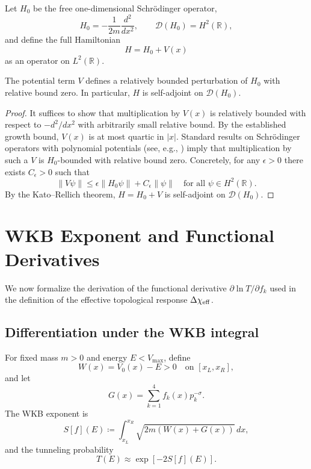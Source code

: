 \documentclass[11pt]{article}
\begin{document}
Let \(H_0\) be the free one-dimensional Schr\"odinger operator,
\begin{equation}
  H_0 = -\frac{1}{2m}\frac{d^2}{dx^2},
  \qquad \mathcal{D}(H_0) = H^2(\mathbb{R}),
\end{equation}
and define the full Hamiltonian
\begin{equation}
  H = H_0 + V(x)
\end{equation}
as an operator on \(L^2(\mathbb{R})\).

\begin{lemma}
The potential term \(V\) defines a relatively bounded perturbation of
\(H_0\) with relative bound zero. In particular, \(H\) is
self-adjoint on \(\mathcal{D}(H_0)\).
\end{lemma}

\begin{proof}
It suffices to show that multiplication by \(V(x)\) is relatively
bounded with respect to \(-d^2/dx^2\) with arbitrarily small relative
bound. By the established growth bound, \(V(x)\) is at most quartic in
\(|x|\). Standard results on Schr\"odinger operators with polynomial
potentials (see, e.g., \cite{reed_simon2}) imply that multiplication by
such a \(V\) is \(H_0\)-bounded with relative bound zero. Concretely,
for any \(\epsilon>0\) there exists \(C_\epsilon>0\) such that
\begin{equation}
  \|V\psi\| \le \epsilon \|H_0\psi\| + C_\epsilon \|\psi\|
  \quad\text{for all } \psi\in H^2(\mathbb{R}).
\end{equation}
By the Kato--Rellich theorem, \(H = H_0 + V\) is self-adjoint on
\(\mathcal{D}(H_0)\).
\end{proof}

\section{WKB Exponent and Functional Derivatives}

We now formalize the derivation of the functional derivative
\(\partial \ln T / \partial f_k\) used in the definition of the
effective topological response \(\Delta\chi_{\rm eff}\).

\subsection{Differentiation under the WKB integral}

For fixed mass \(m>0\) and energy \(E<V_{\max}\), define
\begin{equation}
  W(x) = V_0(x) - E > 0 \quad \text{on } [x_L,x_R],
\end{equation}
and let
\begin{equation}
  G(x) = \sum_{k=1}^4 f_k(x) p_k^{-\sigma}.
\end{equation}
The WKB exponent is
\begin{equation}
  S[f](E)
  \coloneqq \int_{x_L}^{x_R} \sqrt{2m\left(W(x)+G(x)\right)}\,dx,
\end{equation}
and the tunneling probability
\begin{equation}
  T(E) \approx \exp\left[-2 S[f](E)\right].
\end{equation}
\end{document}
